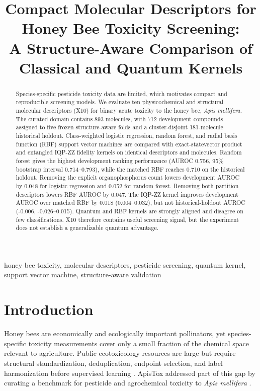 \documentclass[conference]{IEEEtran}
\title{Compact Molecular Descriptors for Honey Bee Toxicity Screening:\\
A Structure-Aware Comparison of Classical and Quantum Kernels}
\author{\IEEEauthorblockN{Anonymous Authors}}
\begin{document}
\maketitle

\begin{abstract}
Species-specific pesticide toxicity data are limited, which motivates compact
and reproducible screening models. We evaluate ten physicochemical and
structural molecular descriptors (X10) for binary acute toxicity to the honey
bee, \textit{Apis mellifera}. The curated domain contains 893 molecules, with
712 development compounds assigned to five frozen structure-aware folds and a
cluster-disjoint 181-molecule historical holdout. Class-weighted logistic
regression, random forest, and radial basis function (RBF) support vector
machines are compared with exact-statevector product and entangled IQP-ZZ
fidelity kernels on identical descriptors and molecules. Random forest gives
the highest development ranking performance (AUROC 0.756, 95\% bootstrap
interval 0.714--0.793), while the matched RBF reaches 0.710 on the historical
holdout. Removing the explicit organophosphorus count lowers development
AUROC by 0.048 for logistic regression and 0.052 for random forest. Removing
both partition descriptors lowers RBF AUROC by 0.047. The IQP-ZZ kernel
improves development AUROC over matched RBF by 0.018 (0.004--0.032), but not
historical-holdout AUROC (-0.006, -0.026--0.015). Quantum and RBF kernels are
strongly aligned and disagree on few classifications. X10 therefore contains
useful screening signal, but the experiment does not establish a generalizable
quantum advantage.
\end{abstract}

\begin{IEEEkeywords}
honey bee toxicity, molecular descriptors, pesticide screening, quantum
kernel, support vector machine, structure-aware validation
\end{IEEEkeywords}

\section{Introduction}

Honey bees are economically and ecologically important pollinators, yet
species-specific toxicity measurements cover only a small fraction of the
chemical space relevant to agriculture. Public ecotoxicology resources are
large but require structural standardization, deduplication, endpoint
selection, and label harmonization before supervised learning
\cite{olker2022ecotox}. ApisTox addressed part of this gap by curating a
benchmark for pesticide and agrochemical toxicity to \textit{Apis mellifera}
\cite{adamczyk2025apistox}.
\end{document}
